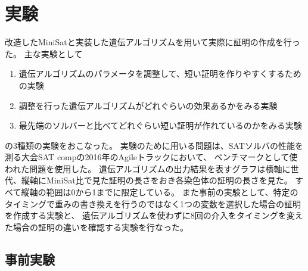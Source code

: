 \newcommand{\myfigure}[2]{
    \begin{figure}[htbp]
        \centering
        \texttt{[image: \#1]}
        \caption{#2}
        \label{fig:#2}
    \end{figure}
}

\newcommand{\reffigure}[1]{図\ref{fig:#1}} %





\section{実験}





改造したMiniSatと実装した遺伝アルゴリズムを用いて実際に証明の作成を行った。
主な実験として
\begin{enumerate}
    \item 遺伝アルゴリズムのパラメータを調整して、短い証明を作りやすくするための実験
    \item 調整を行った遺伝アルゴリズムがどれぐらいの効果あるかをみる実験
    \item 最先端のソルバーと比べてどれぐらい短い証明が作れているのかをみる実験
\end{enumerate}
の3種類の実験をおこなった。
実験のために用いる問題は、SATソルバの性能を測る大会SAT compの2016年のAgileトラックにおいて、
ベンチマークとして使われた問題を使用した。
遺伝アルゴリズムの出力結果を表すグラフは横軸に世代、縦軸にMiniSat比で見た証明の長さをおき各染色体の証明の長さを見た。
すべて縦軸の範囲は0から1までに限定している。
また事前の実験として、特定のタイミングで重みの書き換えを行うのではなく1つの変数を選択した場合の証明を作成する実験と、
遺伝アルゴリズムを使わずに8回の介入をタイミングを変えた場合の証明の違いを確認する実験を行なった。





\setcounter{subsection}{-1} %





\subsection{事前実験}

